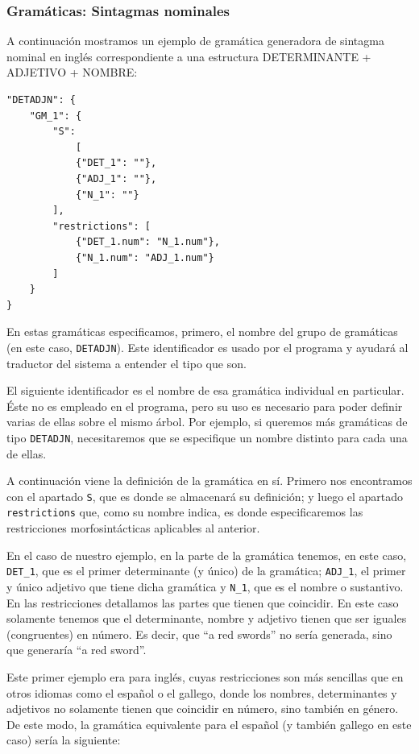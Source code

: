 \subsubsection{Gramáticas: Sintagmas nominales}

A continuación mostramos un ejemplo de gramática generadora de sintagma nominal en inglés correspondiente a una estructura DETERMINANTE + ADJETIVO + NOMBRE:

\begin{lstlisting}[style=json]
"DETADJN": {
    "GM_1": {
        "S": 
            [
            {"DET_1": ""}, 
            {"ADJ_1": ""}, 
            {"N_1": ""}
        ],
        "restrictions": [
            {"DET_1.num": "N_1.num"},
            {"N_1.num": "ADJ_1.num"}
        ]
    }
}
\end{lstlisting}

\noindent En estas gramáticas especificamos, primero, el nombre del grupo de gramáticas (en este caso, \texttt{DETADJN}). Este identificador es usado por el programa y ayudará al traductor del sistema a entender el tipo que son.

El siguiente identificador es el nombre de esa gramática individual en particular. Éste no es empleado en el programa, pero su uso es necesario para poder definir varias de ellas sobre el mismo árbol. Por ejemplo, si queremos más gramáticas de tipo \texttt{DETADJN}, necesitaremos que se especifique un nombre distinto para cada una de ellas.

A continuación viene la definición de la gramática en sí. Primero nos encontramos con el apartado \texttt{S}, que es donde se almacenará su definición; y luego el apartado \texttt{restrictions} que, como su nombre indica, es donde especificaremos las restricciones morfosintácticas aplicables al anterior.

En el caso de nuestro ejemplo, en la parte de la gramática tenemos, en este caso, \texttt{DET\_1}, que es el primer determinante (y único) de la gramática; \texttt{ADJ\_1}, el primer y único adjetivo que tiene dicha gramática y \texttt{N\_1}, que es el nombre o sustantivo.
En las restricciones detallamos las partes que tienen que coincidir. En este caso solamente tenemos que el determinante, nombre y adjetivo tienen que ser iguales (congruentes) en número. Es decir, que ``a red swords'' no sería generada, sino que generaría ``a red sword''.

Este primer ejemplo era para inglés, cuyas restricciones son más sencillas que en otros idiomas como el español o el gallego, donde los nombres, determinantes y adjetivos no solamente tienen que coincidir en número, sino también en género. De este modo, la gramática equivalente para el español (y también gallego en este caso) sería la siguiente:

